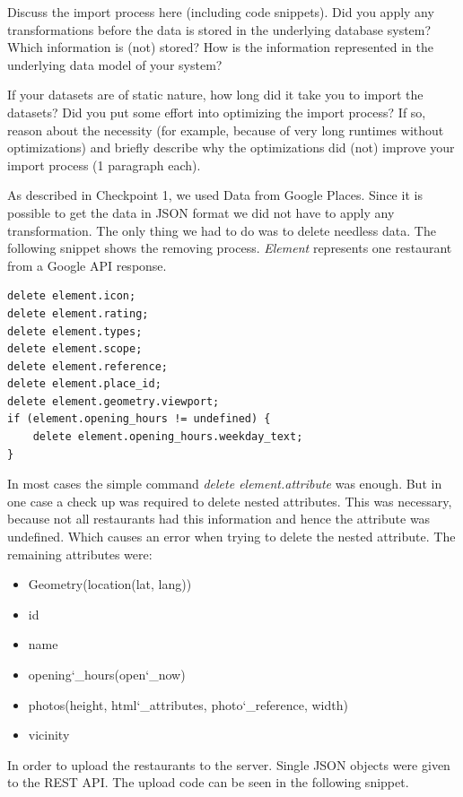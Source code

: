 Discuss the import process here (including code snippets). Did you apply any
transformations before the data is stored in the underlying database system?
Which information is (not) stored? How is the information represented in the
underlying data model of your system?

If your datasets are of static nature, how long did it take you to import the
datasets? Did you put some effort into optimizing the import process? If so,
reason about the necessity (for example, because of very long runtimes without
optimizations) and briefly describe why the optimizations did (not) improve your
import process (1 paragraph each).

As described in Checkpoint 1, we used Data from Google Places. Since it is possible to get the data in JSON format we did not have to apply any transformation. The only thing we had to do was to delete needless data. The following snippet shows the removing process. \textit{Element} represents one restaurant from a Google API response.

\begin{lstlisting}
delete element.icon;
delete element.rating;
delete element.types;
delete element.scope;
delete element.reference;
delete element.place_id;
delete element.geometry.viewport;
if (element.opening_hours != undefined) {
	delete element.opening_hours.weekday_text;
}
\end{lstlisting}

In most cases the simple command \textit{delete element.attribute} was enough. But in one case a check up was required to delete nested attributes. This was necessary, because not all restaurants had this information and hence the attribute was undefined. Which causes an error when trying to delete the nested attribute. The remaining attributes were:

\begin{itemize}  
\item Geometry(location(lat, lang))
\item id
\item name
\item opening\char`_hours(open\char`_now)
\item photos(height, html\char`_attributes, photo\char`_reference, width)
\item vicinity
\end{itemize}

In order to upload the restaurants to the server. Single JSON objects were given to the REST API. The upload code can be seen in the following snippet.

